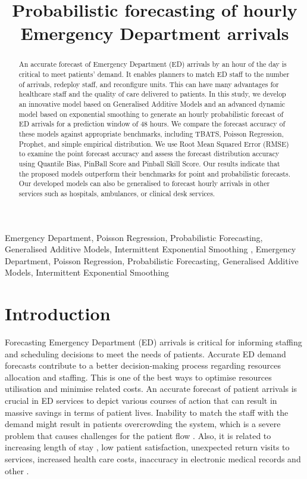 \documentclass[]{elsarticle} %
\begin{document}
\begin{frontmatter}

  \title{Probabilistic forecasting of hourly Emergency Department arrivals}
  
  \begin{abstract}
  An accurate forecast of Emergency Department (ED) arrivals by an hour of the day is critical to meet patients' demand. It enables planners to match ED staff to the number of arrivals, redeploy staff, and reconfigure units. This can have many advantages for healthcare staff and the quality of care delivered to patients. In this study, we develop an innovative model based on Generalised Additive Models and an advanced dynamic model based on exponential smoothing to generate an hourly probabilistic forecast of ED arrivals for a prediction window of 48 hours. We compare the forecast accuracy of these models against appropriate benchmarks, including TBATS, Poisson Regression, Prophet, and simple empirical distribution. We use Root Mean Squared Error (RMSE) to examine the point forecast accuracy and assess the forecast distribution accuracy using Quantile Bias, PinBall Score and Pinball Skill Score. Our results indicate that the proposed models outperform their benchmarks for point and probabilistic forecasts. Our developed models can also be generalised to forecast hourly arrivals in other services such as hospitals, ambulances, or clinical desk services.
  \end{abstract}
    \begin{keyword}
    Emergency Department, Poisson Regression, Probabilistic Forecasting, Generalised Additive Models, Intermittent Exponential Smoothing \sep 
    Emergency Department, Poisson Regression, Probabilistic Forecasting, Generalised Additive Models, Intermittent Exponential Smoothing
  \end{keyword}
  
 \end{frontmatter}

\hypertarget{introduction}{%
\section{Introduction}\label{introduction}}

Forecasting Emergency Department (ED) arrivals is critical for informing
staffing and scheduling decisions to meet the needs of patients.
Accurate ED demand forecasts contribute to a better decision-making
process regarding resources allocation and staffing. This is one of the
best ways to optimise resources utilisation and minimise related costs.
An accurate forecast of patient arrivals is crucial in ED services to
depict various courses of action that can result in massive savings in
terms of patient lives. Inability to match the staff with the demand
might result in patients overcrowding the system, which is a severe
problem that causes challenges for the patient flow
\citep{derlet2002overcrowding}. Also, it is related to increasing length of
stay \citep{muhammet2015forecasting}, low patient satisfaction, unexpected
return visits to services, increased health care costs, inaccuracy in
electronic medical records and other \citep{rostami2020anticipating}.
\end{document}
